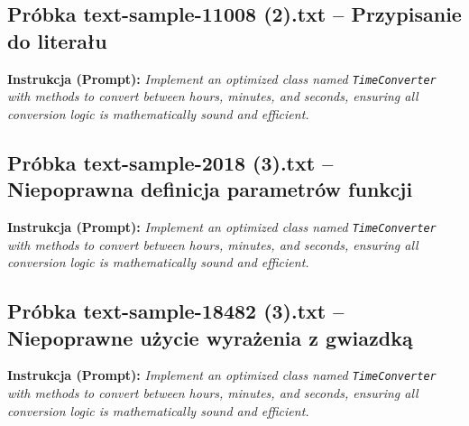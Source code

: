 \subsection{Próbka text-sample-11008 (2).txt -- Przypisanie do literału}
\label{sec:lst:text-sample-11008-2}
\textbf{Instrukcja (Prompt):} \textit{Implement an optimized class named \texttt{TimeConverter} with methods to convert between hours, minutes, and seconds, ensuring all conversion logic is mathematically sound and efficient.}



\subsection{Próbka text-sample-2018 (3).txt -- Niepoprawna definicja parametrów funkcji}
\label{sec:lst:text-sample-2018-3}
\textbf{Instrukcja (Prompt):} \textit{Implement an optimized class named \texttt{TimeConverter} with methods to convert between hours, minutes, and seconds, ensuring all conversion logic is mathematically sound and efficient.}



\subsection{Próbka text-sample-18482 (3).txt -- Niepoprawne użycie wyrażenia z gwiazdką}
\label{sec:lst:text-sample-18482-3}
\textbf{Instrukcja (Prompt):} \textit{Implement an optimized class named \texttt{TimeConverter} with methods to convert between hours, minutes, and seconds, ensuring all conversion logic is mathematically sound and efficient.}



